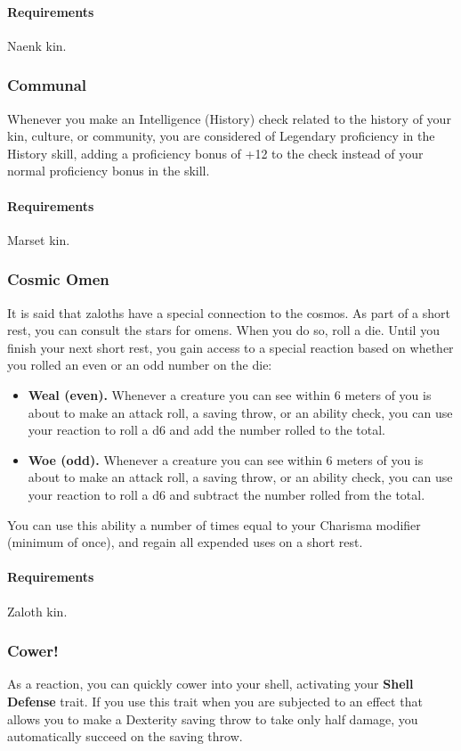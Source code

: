     \paragraph{Requirements} Naenk kin.
\subsubsection{Communal} \label{feat::communal}
    Whenever you make an Intelligence (History) check related to the history of your kin, culture, or community, you are considered of Legendary proficiency in the History skill, adding a proficiency bonus of +12 to the check instead of your normal proficiency bonus in the skill.
    \paragraph{Requirements} Marset kin.
\subsubsection{Cosmic Omen} \label{feat::cosmicomen}
    It is said that zaloths have a special connection to the cosmos.
    As part of a short rest, you can consult the stars for omens.
    When you do so, roll a die.
    Until you finish your next short rest, you gain access to a special reaction based on whether you rolled an even or an odd number on the die:
    \begin{itemize}
        \item \textbf{Weal (even).} Whenever a creature you can see within 6 meters of you is about to make an attack roll, a saving throw, or an ability check, you can use your reaction to roll a d6 and add the number rolled to the total.
        \item \textbf{Woe (odd).} Whenever a creature you can see within 6 meters of you is about to make an attack roll, a saving throw, or an ability check, you can use your reaction to roll a d6 and subtract the number rolled from the total.
    \end{itemize}
    You can use this ability a number of times equal to your Charisma modifier (minimum of once), and regain all expended uses on a short rest.
    \paragraph{Requirements} Zaloth kin.
\subsubsection{Cower!} \label{feat::cower}
    As a reaction, you can quickly cower into your shell, activating your \textbf{Shell Defense} trait.
    If you use this trait when you are subjected to an effect that allows you to make a Dexterity saving throw to take only half damage, you automatically succeed on the saving throw.
